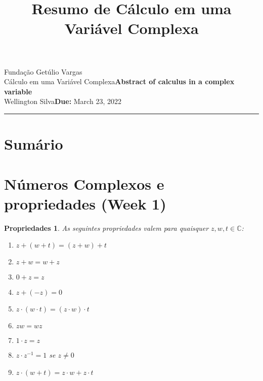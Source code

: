 \documentclass{article}
\title{Resumo de Cálculo em uma Variável Complexa}
\author{}
\date{}
\newtheorem{prop}{Propriedades}
\newcommand{\assignment}{Abstract of calculus in a complex variable}
\newcommand{\duedate}{March 23, 2022}
\begin{document}
Fundação Getúlio Vargas\hfill\\
Cálculo em uma Variável Complexa\hfill\textbf{\assignment}\\
Wellington Silva\hfill\textbf{Due:} \duedate\\
\smallskip\hrule\bigskip

{\let\newpage\relax\maketitle}
\maketitle

\section*{Sumário}

\textbf{}
\vspace{4.0mm}

\textbf{}
\vspace{4.0mm}

\textbf{}
\vspace{4.0mm}

\textbf{}
\vspace{4.0mm}

\newpage

\section*{Números Complexos e propriedades (Week 1)}
\label{s1}

\begin{prop} As seguintes propriedades valem para quaisquer $z, w, t \in \mathbb{C}$:

\begin{enumerate}[label=(\alph*)]
    \item $z + (w + t) = (z + w) + t$
    \item $z + w = w + z$
    \item $0 + z = z$
    \item $z + (-z) = 0$
    \item $z \cdot (w \cdot t) = (z \cdot w) \cdot t$
    \item $zw = wz$
    \item $1 \cdot z = z$
    \item $z \cdot z^{-1} = 1$ se $z \neq 0$
    \item $z \cdot (w + t) = z \cdot w + z \cdot t$
\end{enumerate}
\end{prop}
\end{document}
